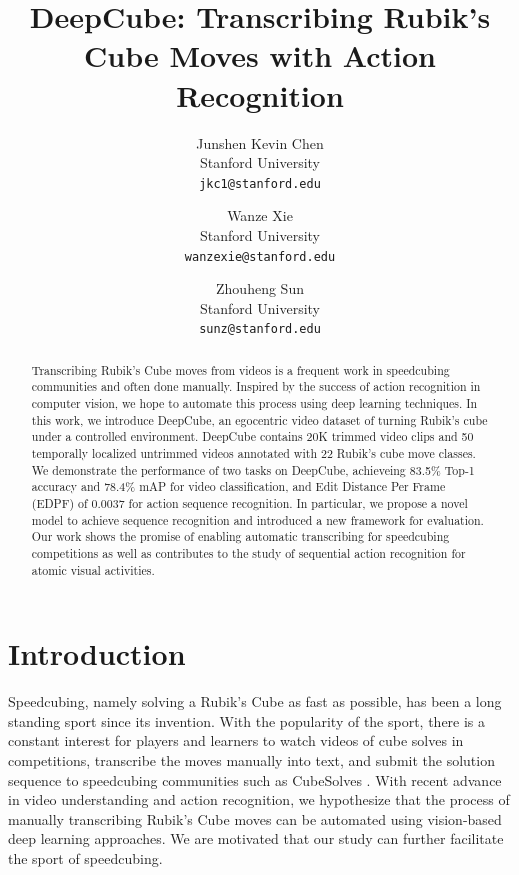 \documentclass[10pt,twocolumn,letterpaper]{article}
\begin{document}
\title{
    DeepCube: Transcribing Rubik's Cube Moves with Action Recognition
}

\author{Junshen Kevin Chen\\
Stanford University\\
{\tt\small jkc1@stanford.edu}
\and
Wanze Xie\\
Stanford University\\
{\tt\small wanzexie@stanford.edu}
\and
Zhouheng Sun\\
Stanford University\\
{\tt\small sunz@stanford.edu}
}

\maketitle

\begin{abstract}


Transcribing Rubik's Cube moves from videos is a frequent work in speedcubing communities and often done manually. Inspired by the success of action recognition in computer vision, we hope to automate this process using deep learning techniques. In this work, we introduce DeepCube, an egocentric video dataset of turning Rubik's cube under a controlled environment. DeepCube contains 20K trimmed video clips and 50 temporally localized untrimmed videos annotated with 22 Rubik's cube move classes. We demonstrate the performance of two tasks on DeepCube, achieveing 83.5\% Top-1 accuracy and 78.4\% mAP for video classification, and Edit Distance Per Frame (EDPF) of 0.0037 for action sequence recognition. In particular, we propose a novel model to achieve sequence recognition and introduced a new framework for evaluation. Our work shows the promise of enabling automatic transcribing for speedcubing competitions as well as contributes to the study of sequential action recognition for atomic visual activities.

\end{abstract}


\section{Introduction}
Speedcubing, namely solving a Rubik's Cube as fast as possible, has been a long standing sport since its invention. With the popularity of the sport, there is a constant interest for players and learners to watch videos of cube solves in competitions, transcribe the moves manually into text, and submit the solution sequence to speedcubing communities such as CubeSolves \cite{CubeSolves}. With recent advance in video understanding and action recognition, we hypothesize that the process of manually transcribing Rubik's Cube moves can be automated using vision-based deep learning approaches. We are motivated that our study can further facilitate the sport of speedcubing.
\end{document}
